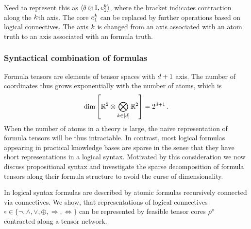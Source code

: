 \begin{remark}
 	Need to represent this as $\braket{\delta \otimes \mathbb{I}, e_1^{k}}$, where the bracket indicates contraction along the $k$th axis.
	The core $e_1^{k}$ can be replaced by further operations based on logical connectives.
	The axis $k$ is changed from an axis associated with an atom truth to an axis associated with an formula truth.
\end{remark}


\subsubsection{Syntactical combination of formulas}

Formula tensors are elements of tensor spaces with $d+1$ axis. 
The number of coordinates thus grows exponentially with the number of atoms, which is
	\[ \dim\left[ \mathbb{R}^2 \otimes \bigotimes_{k\in[d]}\mathbb{R}^{2} \right] = 2^{d +1} \, . \]
When the number of atoms in a theory is large, the naive representation of formula tensors will be thus intractable.
In contrast, most logical formulas appearing in practical knowledge bases are sparse in the sense that they have short representations in a logical syntax.
Motivated by this consideration we now discuss propositional syntax and investigate the sparse decomposition of formula tensors along their formula structure to avoid the curse of dimensionality.

In logical syntax formulas are described by atomic formulas recursively connected via connectives. 
We show, that representations of logical connectives $\circ \in \{\lnot, \land, \lor, \oplus, \Rightarrow, \Leftrightarrow\}$ can be represented by feasible tensor cores $\rho^{\circ}$ contracted along a tensor network.




